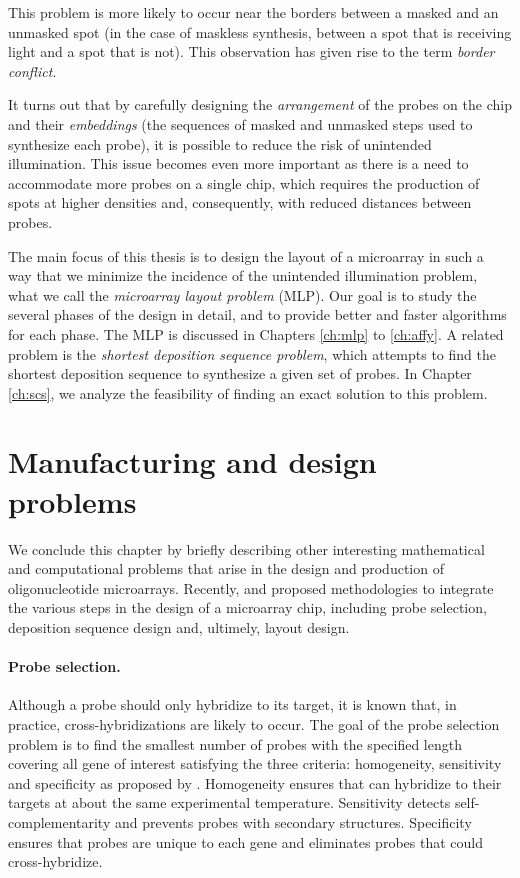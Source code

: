 This problem is more likely to occur near the borders between a masked and an
unmasked spot (in the case of maskless synthesis, between a spot that is
receiving light and a spot that is not). This observation has given rise to the
term \emph{border conflict}.

It turns out that by carefully designing the \emph{arrangement} of the probes on
the chip and their \emph{embeddings} (the sequences of masked and unmasked steps
used to synthesize each probe), it is possible to reduce the risk of unintended
illumination. This issue becomes even more important as there is a need to
accommodate more probes on a single chip, which requires the production of spots
at higher densities and, consequently, with reduced distances between probes.

The main focus of this thesis is to design the layout of a microarray in such a
way that we minimize the incidence of the unintended illumination problem, what
we call the \emph{microarray layout problem} (MLP). Our goal is to study the
several phases of the design in detail, and to provide better and faster
algorithms for each phase. The MLP is discussed in Chapters \ref{ch:mlp} to
\ref{ch:affy}. A related problem is the \emph{shortest deposition sequence
problem}, which attempts to find the shortest deposition sequence to synthesize
a given set of probes. In Chapter \ref{ch:scs}, we analyze the feasibility of
finding an exact solution to this problem.

\section{Manufacturing and design problems}
\label{sec:intro_problems}

We conclude this chapter by briefly describing other interesting mathematical
and computational problems that arise in the design and production of
oligonucleotide microarrays. Recently, \citet{Kahng2003b,Kahng2006} and
\citet{Atlas2004} proposed methodologies to integrate the various steps in the
design of a microarray chip, including probe selection, deposition sequence
design and, ultimely, layout design.

\paragraph{Probe selection.} Although a probe should only hybridize to its
target, it is known that, in practice, cross-hybridizations are likely to occur.
The goal of the probe selection problem is to find the smallest number of probes
with the specified length covering all gene of interest satisfying the three
criteria: homogeneity, sensitivity and specificity as proposed by
\citep{Lockhart1996}. Homogeneity ensures that can hybridize to their targets at
about the same experimental temperature. Sensitivity detects
self-complementarity and prevents probes with secondary structures. Specificity
ensures that probes are unique to each gene and eliminates probes that could
cross-hybridize.

